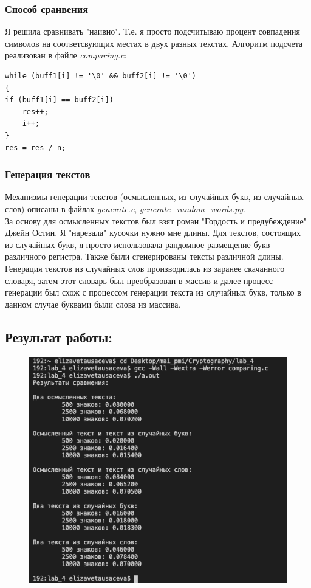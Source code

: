 \documentclass[12pt]{article}
\begin{document}
\subsubsection*{Способ сранвения}
Я решила сравнивать "наивно". Т.е. я просто подсчитываю процент совпадения символов на соответсвующих местах в двух разных текстах. Алгоритм подсчета реализован в файле {\it comparing.c}:
\lstset{language=C}
\begin{lstlisting}
while (buff1[i] != '\0' && buff2[i] != '\0')
{
if (buff1[i] == buff2[i])
	res++;
	i++;
}
res = res / n;
\end{lstlisting}
\subsubsection*{Генерация текстов}
Механизмы генерации текстов (осмысленных, из случайных букв, из случайных слов) описаны в файлах {\it generate.c}, {\it generate\_random\_words.py}.
\\
За основу для осмысленных текстов был взят роман "Гордость и предубеждение" Джейн Остин. Я "нарезала" кусочки нужно мне длины. Для текстов, состоящих из случайных букв, я просто использовала рандомное размещение букв различного регистра. Также были сгенерированы тексты различной длины. Генерация текстов из случайных слов производилась из заранее скачанного словаря, затем этот словарь был преобразован в массив и далее процесс генерации был схож с процессом генерации текста из случайных букв, только в данном случае буквами были слова из массива.

\subsection*{Результат работы:}
\begin{figure}[h]
    \centering
    \includegraphics[width=0.5\linewidth]{1.png}
\end{figure}
\end{document}
